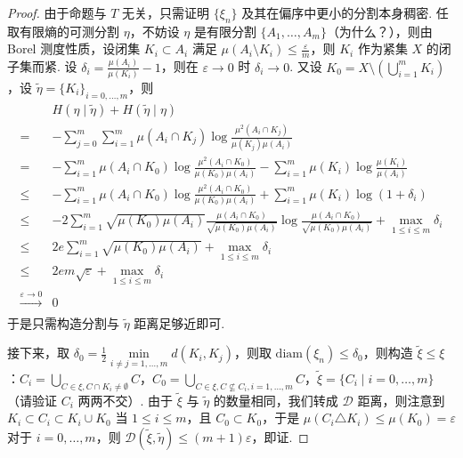 \documentclass[11pt, a4paper, oneside]{ctexart}
\newcommand{\cD}{\mathcal{D}}
\newcommand{\diam}{\mathrm{diam}}
\begin{document}
    \begin{proof}
        由于命题与 $T$ 无关，只需证明 $\{\xi_n\}$ 及其在偏序中更小的分割本身稠密. 任取有限熵的可测分割 $\eta$，不妨设 $\eta$ 是有限分割 $\{A_1,\ldots,A_m\}$（为什么？），则由 Borel 测度性质，设闭集 $K_i\subset A_i$ 满足 $\mu(A_i\setminus K_i)\leq \frac{\varepsilon}{m}$，则 $K_i$ 作为紧集 $X$ 的闭子集而紧. 设 $\delta_i=\frac{\mu(A_i)}{\mu(K_i)}-1$，则在 $\varepsilon\to 0$ 时 $\delta_i\to 0$. 又设 $K_0=X\setminus(\bigcup\limits_{i=1}^{m}K_i)$，设 $\tilde{\eta}={\{K_i\}}_{i=0,\ldots,m}$，则
        \begin{equation*}
            \begin{aligned}
                &H(\eta\mid \tilde{\eta})+H(\tilde{\eta}\mid \eta)\\
                =&-\sum\limits_{j=0}^{m}\sum\limits_{i=1}^{m}\mu(A_i\cap K_j)\log \frac{\mu^2(A_i\cap K_j)}{\mu(K_j)\mu(A_i)}\\
                =&-\sum\limits_{i=1}^{m}\mu(A_i\cap K_0)\log \frac{\mu^2(A_i\cap K_0)}{\mu(K_0)\mu(A_i)}-\sum\limits_{i=1}^{m}\mu(K_i)\log \frac{\mu(K_i)}{\mu(A_i)}\\
                \leq&-\sum\limits_{i=1}^{m}\mu(A_i\cap K_0)\log \frac{\mu^2(A_i\cap K_0)}{\mu(K_0)\mu(A_i)}+\sum\limits_{i=1}^{m}\mu(K_i)\log(1+\delta_i)\\
                \leq&-2\sum\limits_{i=1}^{m}\sqrt{\mu(K_0)\mu(A_i)}\frac{\mu(A_i\cap K_0)}{\sqrt{\mu(K_0)\mu(A_i)}}\log \frac{\mu(A_i\cap K_0)}{\sqrt{\mu(K_0)\mu(A_i)}}+\max\limits_{1\leq i\leq m}\delta_i\\
                \leq&2e\sum\limits_{i=1}^{m}\sqrt{\mu(K_0)\mu(A_i)}+\max\limits_{1\leq i\leq m}\delta_i\\
                \leq&2em\sqrt{\varepsilon}+\max\limits_{1\leq i\leq m}\delta_i\\
                \stackrel{\varepsilon\to 0}{\longrightarrow}&0\\
            \end{aligned}
        \end{equation*}
        于是只需构造分割与 $\tilde{\eta}$ 距离足够近即可.

        接下来，取 $\delta_0=\frac{1}{2}\min\limits_{i\neq j=1,\ldots,m}d(K_i,K_j)$，则取 $\diam(\xi_n)\leq \delta_0$，则构造 $\tilde{\xi}\leq \xi$：$C_i=\bigcup\limits_{C\in\xi,C\cap K_i\neq\emptyset}C$，$C_0=\bigcup\limits_{C\in \xi,C\nsubseteq C_i,i=1,\ldots,m}C$，$\tilde{\xi}=\{C_i\mid i=0,\ldots,m\}$（请验证 $C_i$ 两两不交）. 由于 $\tilde{\xi}$ 与 $\tilde{\eta}$ 的数量相同，我们转成 $\cD$ 距离，则注意到 $K_i\subset C_i\subset K_i\cup K_0$ 当 $1\leq i\leq m$，且 $C_0\subset K_0$，于是 $\mu(C_i\triangle K_i)\leq \mu(K_0)=\varepsilon$ 对于 $i=0,\ldots,m$，则 $\cD(\tilde{\xi},\tilde{\eta})\leq (m+1)\varepsilon$，即证.
    \end{proof}
\end{document}
